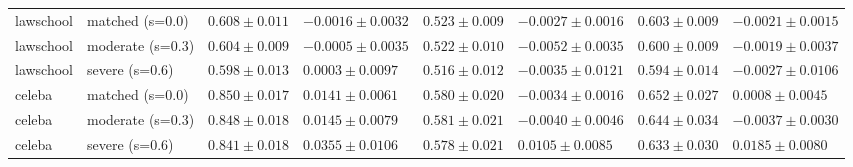 \begin{table}[!t]
{\begin{tabular}{llllllll}
lawschool & matched (s=0.0) & $0.608\pm0.011$ & $-0.0016\pm0.0032$ & $0.523\pm0.009$ & $-0.0027\pm0.0016$ & $0.603\pm0.009$ & $-0.0021\pm0.0015$ \\
lawschool & moderate (s=0.3) & $0.604\pm0.009$ & $-0.0005\pm0.0035$ & $0.522\pm0.010$ & $-0.0052\pm0.0035$ & $0.600\pm0.009$ & $-0.0019\pm0.0037$ \\
lawschool & severe (s=0.6) & $0.598\pm0.013$ & $0.0003\pm0.0097$ & $0.516\pm0.012$ & $-0.0035\pm0.0121$ & $0.594\pm0.014$ & $-0.0027\pm0.0106$ \\
celeba & matched (s=0.0) & $0.850\pm0.017$ & $0.0141\pm0.0061$ & $0.580\pm0.020$ & $-0.0034\pm0.0016$ & $0.652\pm0.027$ & $0.0008\pm0.0045$ \\
celeba & moderate (s=0.3) & $0.848\pm0.018$ & $0.0145\pm0.0079$ & $0.581\pm0.021$ & $-0.0040\pm0.0046$ & $0.644\pm0.034$ & $-0.0037\pm0.0030$ \\
celeba & severe (s=0.6) & $0.841\pm0.018$ & $0.0355\pm0.0106$ & $0.578\pm0.021$ & $0.0105\pm0.0085$ & $0.633\pm0.030$ & $0.0185\pm0.0080$ \\
\hline
\end{tabular}
}
\end{table}